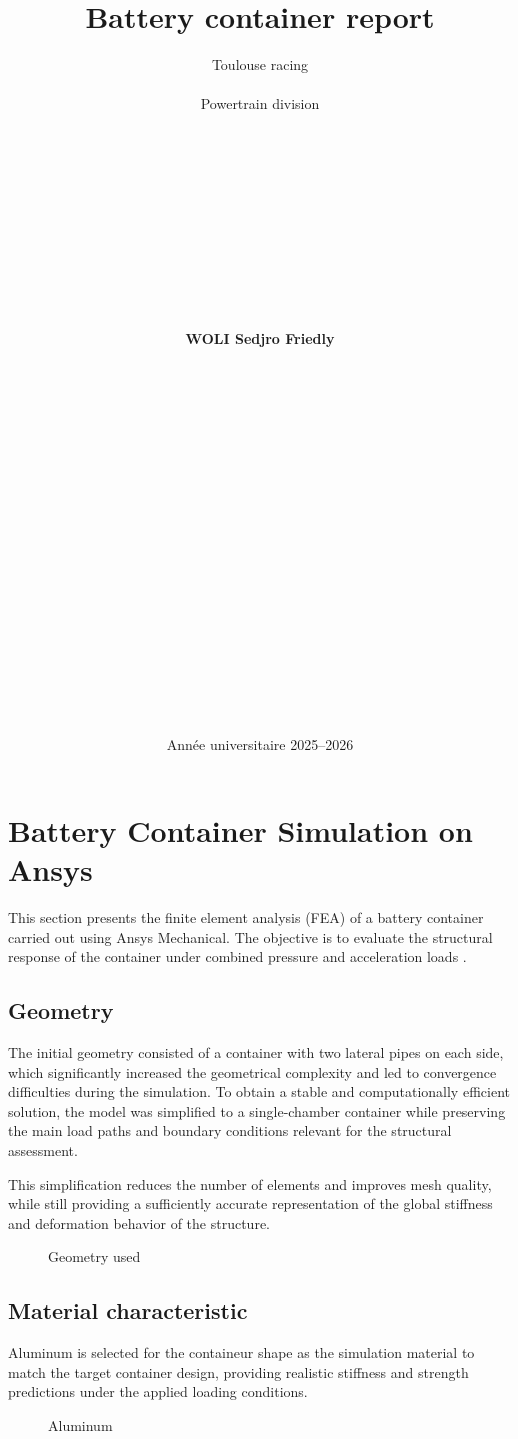 \documentclass[11pt,a4paper]{article}
\title{\textbf{Battery container report}}
\author{
	Toulouse racing \\ \\
	Powertrain division \\ \\
	\\ \\ \\ \\ \\ \\ \\ \\ \\ \\ 
	\textbf{WOLI Sedjro Friedly }
	\\ \\ \\ \\ \\ \\ \\ \\ \\ \\  \\ \\ \\ \\ \\ \\ \\ \\ \\ \\ 
}
\date{Année universitaire 2025--2026}
\begin{document}
	
	
	\maketitle
	\thispagestyle{empty}
	\newpage
	
	\tableofcontents
	\newpage
	
	
	\section{Battery Container Simulation on Ansys}
	
	This section presents the finite element analysis (FEA) of a battery container carried out using Ansys Mechanical. The objective is to evaluate the structural response of the container under combined pressure and acceleration loads .
	
	
	\subsection{Geometry}
	
	The initial geometry consisted of a container with two lateral pipes on each side, which significantly increased the geometrical complexity and led to convergence difficulties during the simulation. 
	To obtain a stable and computationally efficient solution, the model was simplified to a single-chamber container while preserving the main load paths and boundary conditions relevant for the structural assessment.
	
	This simplification reduces the number of elements and improves mesh quality, while still providing a sufficiently accurate representation of the global stiffness and deformation behavior of the structure.
	
	\begin{figure}[H]
		\centering
		\caption{Geometry used  }
		\label{fig: Geometry }
	\end{figure}
	
	
	\subsection{Material characteristic}
	
	
		Aluminum is selected for the containeur shape as the simulation material to match the target container design, providing realistic stiffness and strength predictions under the applied loading conditions.
		
		\begin{figure}[H]
			\centering
			\caption{Aluminum  }
			\label{fig: Material}
		\end{figure}
		
\end{document}
